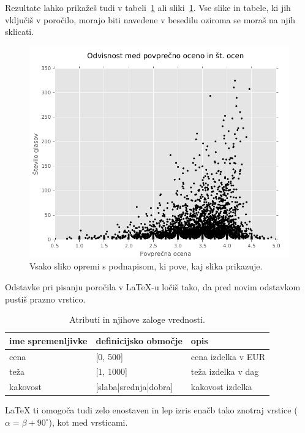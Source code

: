 \documentclass[a4paper,11pt]{article}
\begin{document}
Rezultate lahko prikažeš tudi v tabeli~\ref{tab1} ali sliki~\ref{slika1}. 
Vse slike in tabele, ki jih vključiš v poročilo, morajo biti navedene v 
besedilu oziroma se moraš na njih sklicati.

\begin{figure}[htbp]
\begin{center}
\includegraphics[scale=0.5]{slika-primer.png}
\caption{Vsako sliko opremi s podnapisom, ki pove, kaj slika prikazuje.}
\label{slika1}
\end{center}
\end{figure}

Odstavke pri pisanju poročila v LaTeX-u ločiš tako, da pred novim
odstavkom pustiš prazno vrstico.
\begin{table}[htbp]
\caption{Atributi in njihove zaloge vrednosti.}
\label{tab1}
\begin{center}
\begin{tabular}{llp{3cm}}
\hline
ime spremenljivke & definicijsko območje & opis \\
\hline
cena & [0, 500] & cena izdelka v EUR\\
teža & [1, 1000] & teža izdelka v dag \\
kakovost & [slaba|srednja|dobra] & kakovost izdelka \\
\hline
\end{tabular}
\end{center}
\end{table}

LaTeX ti omogoča tudi zelo enostaven in lep izris enačb tako znotraj vrstice
($\alpha = \beta + 90^{\circ}$), kot med vrsticami.
\end{document}
